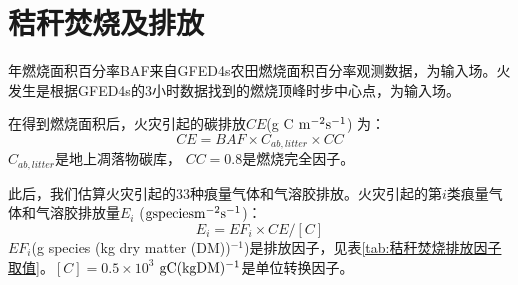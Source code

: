 \section{秸秆焚烧及排放}
年燃烧面积百分率BAF来自GFED4s农田燃烧面积百分率观测数据，为输入场。火发生是根据GFED4s的3小时数据找到的燃烧顶峰时步中心点，为输入场。

在得到燃烧面积后，火灾引起的碳排放$CE$(g C $\rm m^{-2} s^{-1}$) 为：
\begin{equation}
CE=BAF \times C_{ab,litter} \times CC
\end{equation}
$C_{ab,litter}$是地上凋落物碳库， $CC=0.8$是燃烧完全因子。

此后，我们估算火灾引起的33种痕量气体和气溶胶排放。火灾引起的第$i$类痕量气体和气溶胶排放量$E_i$ ($\rm g species m^{-2} s^{-1}$)：
\begin{equation}
E_{i}=EF_{i} \times CE /[{C}]
\end{equation}
$EF_i$(g species (kg dry matter (DM))$^{-1}$)是排放因子，见表\ref{tab:秸秆焚烧排放因子取值}。$[C]=0.5×10^3$ $\rm g C (kg DM)^{-1}$是单位转换因子。


